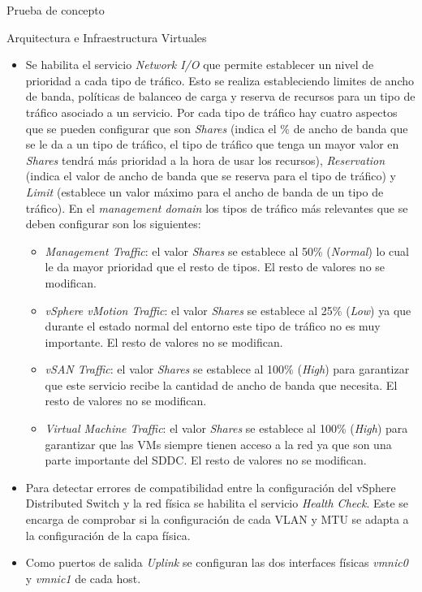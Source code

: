 \begin{section}{Prueba de concepto}
\begin{subsection}{Arquitectura e Infraestructura Virtuales\cite{CFVirtInfraes}}
\begin{itemize}
    \item Se habilita el servicio \textit{Network I/O} que permite establecer un nivel de prioridad a cada tipo de tráfico. Esto se realiza estableciendo limites de ancho de banda, políticas de balanceo de carga y reserva de recursos para un tipo de tráfico asociado a un servicio. Por cada tipo de tráfico hay cuatro aspectos que se pueden configurar que son \textit{Shares} (indica el \% de ancho de banda que se le da a un tipo de tráfico, el tipo de tráfico que tenga un mayor valor en \textit{Shares} tendrá más prioridad a la hora de usar los recursos), \textit{Reservation} (indica el valor de ancho de banda que se reserva para el tipo de tráfico) y \textit{Limit} (establece un valor máximo para el ancho de banda de un tipo de tráfico). En el \textit{management domain} los tipos de tráfico más relevantes que se deben configurar son los siguientes:
    \begin{itemize}
      \item \textit{Management Traffic}: el valor \textit{Shares} se establece al 50\% (\textit{Normal}) lo cual le da mayor prioridad que el resto de tipos. El resto de valores no se modifican.
      \item \textit{vSphere vMotion Traffic}: el valor \textit{Shares} se establece al 25\% (\textit{Low}) ya que durante el estado normal del entorno este tipo de tráfico no es muy importante. El resto de valores no se modifican.
      \item \textit{vSAN Traffic}: el valor \textit{Shares} se establece al 100\% (\textit{High}) para garantizar que este servicio recibe la cantidad de ancho de banda que necesita. El resto de valores no se modifican.
      \item \textit{Virtual Machine Traffic}: el valor \textit{Shares} se establece al 100\% (\textit{High}) para garantizar que las VMs siempre tienen acceso a la red ya que son una parte importante del SDDC. El resto de valores no se modifican.
    \end{itemize}
    
    \item Para detectar errores de compatibilidad entre la configuración del vSphere Distributed Switch y la red física se habilita el servicio \textit{Health Check}. Este se encarga de comprobar si la configuración de cada VLAN y MTU se adapta a la configuración de la capa física.
    
    \item Como puertos de salida \textit{Uplink} se configuran las dos interfaces físicas \textit{vmnic0} y \textit{vmnic1} de cada host.
    

\end{itemize}
\end{subsection}
\end{section}
